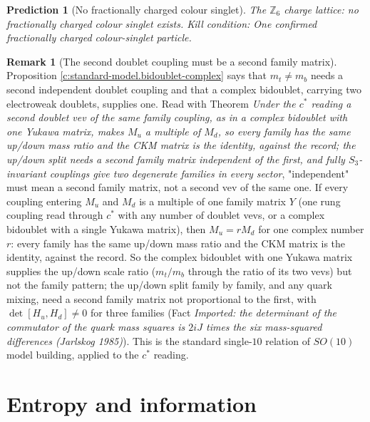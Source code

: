 \documentclass[11pt]{article}
\newtheorem{prediction}[theorem]{Prediction}
\theoremstyle{definition}
\newtheorem{remark}[theorem]{Remark}
\theoremstyle{plain}
\newcommand{\changedmark}[2]{\marginpar{\raggedright\scriptsize\color{#1}#2}}
\begin{document}
\begin{prediction}[No fractionally charged colour singlet]\label{c:pred.z6-charge-lattice}
The $\mathbb{Z}_{6}$ charge lattice: no fractionally charged colour singlet exists.
\emph{Kill condition:} One confirmed fractionally charged colour-singlet particle.
\end{prediction}

\begin{remark}[The second doublet coupling must be a second family matrix]\label{c:note.standard-model.second-doublet-coupling-is-a-second-family-matrix}
\changedmark{MidnightBlue}{added since the deposit}
Proposition \ref{c:standard-model.bidoublet-complex} says that $m_{t} \ne m_{b}$ needs a second independent doublet coupling and that a complex bidoublet, carrying two electroweak doublets, supplies one. Read with Theorem \emph{Under the $c^{*}$ reading a second doublet vev of the same family coupling, as in a complex bidoublet with one Yukawa matrix, makes $M_{u}$ a multiple of $M_{d}$, so every family has the same up/down mass ratio and the CKM matrix is the identity, against the record; the up/down split needs a second family matrix independent of the first, and fully $S_{3}$-invariant couplings give two degenerate families in every sector}, "independent" must mean a second family matrix, not a second vev of the same one. If every coupling entering $M_{u}$ and $M_{d}$ is a multiple of one family matrix $Y$ (one rung coupling read through $c^{*}$ with any number of doublet vevs, or a complex bidoublet with a single Yukawa matrix), then $M_{u} = rM_{d}$ for one complex number $r$: every family has the same up/down mass ratio and the CKM matrix is the identity, against the record. So the complex bidoublet with one Yukawa matrix supplies the up/down scale ratio ($m_{t}/m_{b}$ through the ratio of its two vevs) but not the family pattern; the up/down split family by family, and any quark mixing, need a second family matrix not proportional to the first, with $\det[H_{u}, H_{d}] \ne 0$ for three families (Fact \emph{Imported: the determinant of the commutator of the quark mass squares is $2iJ$ times the six mass-squared differences (Jarlskog 1985)}). This is the standard single-$10$ relation of $SO(10)$ model building, applied to the $c^{*}$ reading.
\end{remark}

\section{Entropy and information}
\end{document}
